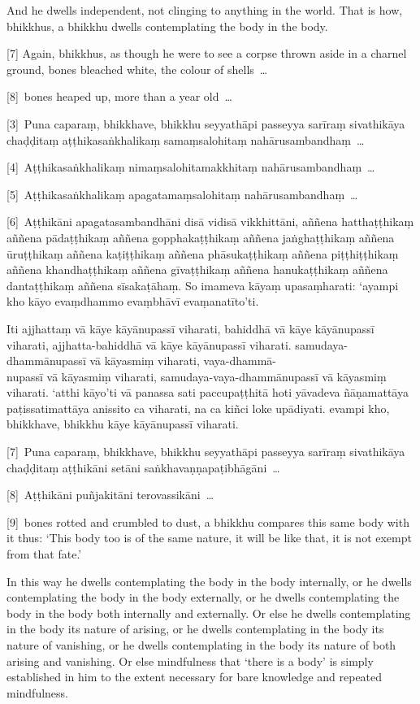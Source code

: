 And he dwells independent, not clinging to anything in the world. That is how,
bhikkhus, a bhikkhu dwells contemplating the body in the body.

[7] Again, bhikkhus, as though he were to see a corpse thrown aside in a charnel
ground, bones bleached white, the colour of shells~\ldots{}

[8]~bones heaped up, more than a year old~\ldots{}

\paliPage

[3]~Puna caparaṃ, bhikkhave, bhikkhu seyyathāpi passeyya sarīraṃ sivathikāya
chaḍḍitaṃ aṭṭhikasaṅkhalikaṃ samaṃsalohitaṃ nahārusambandhaṃ~\ldots{}

[4]~Aṭṭhikasaṅkhalikaṃ nimaṃsalohitamakkhitaṃ nahārusambandhaṃ~\ldots{}

[5]~Aṭṭhikasaṅkhalikaṃ apagatamaṃsalohitaṃ nahārusambandhaṃ~\ldots{}

[6]~Aṭṭhikāni apagatasambandhāni disā vidisā vikkhittāni, aññena hatthaṭṭhikaṃ
aññena pādaṭṭhikaṃ aññena gopphakaṭṭhikaṃ aññena jaṅghaṭṭhikaṃ aññena ūruṭṭhikaṃ
aññena kaṭiṭṭhikaṃ aññena phāsukaṭṭhikaṃ aññena piṭṭhiṭṭhikaṃ aññena
khandhaṭṭhikaṃ aññena gīvaṭṭhikaṃ aññena hanukaṭṭhikaṃ aññena dantaṭṭhikaṃ
aññena sīsakaṭāhaṃ. So imameva kāyaṃ upasaṃharati: ‘ayampi kho kāyo evaṃdhammo
evaṃbhāvī evaṃanatīto’ti.

Iti ajjhattaṃ vā kāye kāyānupassī viharati, bahiddhā vā kāye kāyānupassī
viharati, ajjhatta-bahiddhā vā kāye kāyānupassī viharati. samudaya-dhammānupassī
vā kāyasmiṃ viharati, vaya-dhammā-\\
nupassī vā kāyasmiṃ viharati, samudaya-vaya-dhammānupassī vā kāyasmiṃ viharati.
‘atthi kāyo’ti vā panassa sati paccupaṭṭhitā hoti yāvadeva ñāṇamattāya
paṭissatimattāya anissito ca viharati, na ca kiñci loke upādiyati. evampi kho,
bhikkhave, bhikkhu kāye kāyānupassī viharati.

[7]~Puna caparaṃ, bhikkhave, bhikkhu seyyathāpi passeyya sarīraṃ sivathikāya
chaḍḍitaṃ aṭṭhikāni setāni saṅkhavaṇṇapaṭibhāgāni~\ldots{}

[8]~Aṭṭhikāni puñjakitāni terovassikāni~\ldots{}

\englishPage

[9]~bones rotted and crumbled to dust, a bhikkhu compares this same
body with it thus: ‘This body too is of the same nature, it will be like that,
it is not exempt from that fate.’

In this way he dwells contemplating the body in the body internally, or he
dwells contemplating the body in the body externally, or he dwells contemplating
the body in the body both internally and externally. Or else he dwells
contemplating in the body its nature of arising, or he dwells contemplating in
the body its nature of vanishing, or he dwells contemplating in the body its
nature of both arising and vanishing. Or else mindfulness that ‘there is a body’
is simply established in him to the extent necessary for bare knowledge and
repeated mindfulness.

